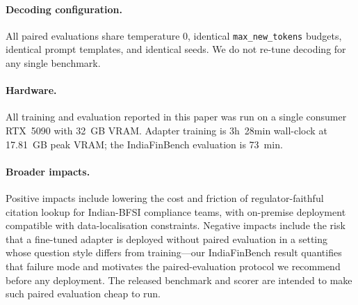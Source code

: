 \documentclass{article}
\begin{document}
\paragraph{Decoding configuration.} All paired evaluations share temperature $0$, identical \texttt{max\_new\_tokens} budgets, identical prompt templates, and identical seeds. We do not re-tune decoding for any single benchmark.

\paragraph{Hardware.} All training and evaluation reported in this paper was run on a single consumer RTX~5090 with 32~GB VRAM. Adapter training is 3h~28min wall-clock at 17.81~GB peak VRAM; the IndiaFinBench evaluation is 73~min.

\paragraph{Broader impacts.} Positive impacts include lowering the cost and friction of regulator-faithful citation lookup for Indian-BFSI compliance teams, with on-premise deployment compatible with data-localisation constraints. Negative impacts include the risk that a fine-tuned adapter is deployed without paired evaluation in a setting whose question style differs from training---our IndiaFinBench result quantifies that failure mode and motivates the paired-evaluation protocol we recommend before any deployment. The released benchmark and scorer are intended to make such paired evaluation cheap to run.

\newpage

\end{document}
